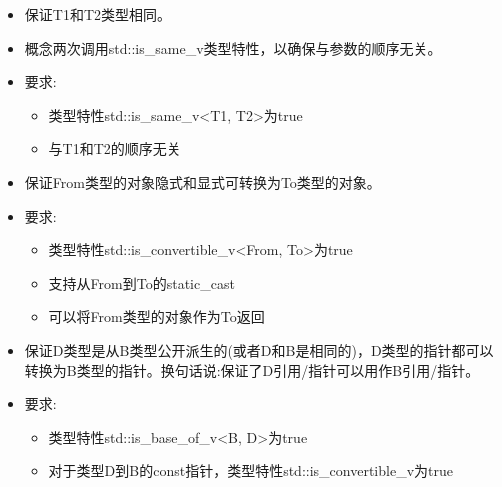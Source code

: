 

\begin{itemize}
\item
保证T1和T2类型相同。

\item
概念两次调用std::is\_same\_v类型特性，以确保与参数的顺序无关。

\item
要求:
\begin{itemize}
\item
类型特性std::is\_same\_v<T1, T2>为true

\item
与T1和T2的顺序无关
\end{itemize}
\end{itemize}


\begin{itemize}
\item
保证From类型的对象隐式和显式可转换为To类型的对象。

\item
要求:
\begin{itemize}
\item
类型特性std::is\_convertible\_v<From, To>为true

\item
支持从From到To的static\_cast

\item
可以将From类型的对象作为To返回
\end{itemize}
\end{itemize}


\begin{itemize}
\item
保证D类型是从B类型公开派生的(或者D和B是相同的)，D类型的指针都可以转换为B类型的指针。换句话说:保证了D引用/指针可以用作B引用/指针。

\item
要求:
\begin{itemize}
\item
类型特性std::is\_base\_of\_v<B, D>为true

\item
对于类型D到B的const指针，类型特性std::is\_convertible\_v为true
\end{itemize}
\end{itemize}

